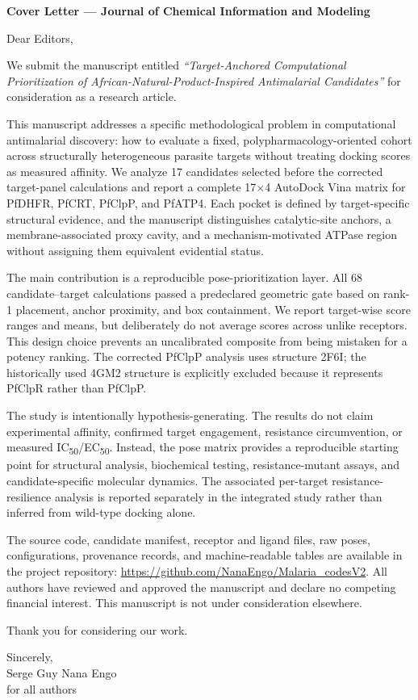 \documentclass[11pt]{article}
\begin{document}
\noindent\textbf{Cover Letter — Journal of Chemical Information and Modeling}

\vspace{1em}
Dear Editors,

We submit the manuscript entitled \textit{“Target-Anchored Computational Prioritization of African-Natural-Product-Inspired Antimalarial Candidates”} for consideration as a research article.

This manuscript addresses a specific methodological problem in computational antimalarial discovery: how to evaluate a fixed, polypharmacology-oriented cohort across structurally heterogeneous parasite targets without treating docking scores as measured affinity. We analyze \num{17} candidates selected before the corrected target-panel calculations and report a complete \num{17}$\times$\num{4} AutoDock Vina matrix for PfDHFR, PfCRT, PfClpP, and PfATP4. Each pocket is defined by target-specific structural evidence, and the manuscript distinguishes catalytic-site anchors, a membrane-associated proxy cavity, and a mechanism-motivated ATPase region without assigning them equivalent evidential status.

The main contribution is a reproducible pose-prioritization layer. All \num{68} candidate--target calculations passed a predeclared geometric gate based on rank-1 placement, anchor proximity, and box containment. We report target-wise score ranges and means, but deliberately do not average scores across unlike receptors. This design choice prevents an uncalibrated composite from being mistaken for a potency ranking. The corrected PfClpP analysis uses structure 2F6I; the historically used 4GM2 structure is explicitly excluded because it represents PfClpR rather than PfClpP.

The study is intentionally hypothesis-generating. The results do not claim experimental affinity, confirmed target engagement, resistance circumvention, or measured IC\textsubscript{50}/EC\textsubscript{50}. Instead, the pose matrix provides a reproducible starting point for structural analysis, biochemical testing, resistance-mutant assays, and candidate-specific molecular dynamics. The associated per-target resistance-resilience analysis is reported separately in the integrated study rather than inferred from wild-type docking alone.

The source code, candidate manifest, receptor and ligand files, raw poses, configurations, provenance records, and machine-readable tables are available in the project repository: \url{https://github.com/NanaEngo/Malaria_codesV2}. All authors have reviewed and approved the manuscript and declare no competing financial interest. This manuscript is not under consideration elsewhere.

Thank you for considering our work.

\vspace{1em}
Sincerely,\\
Serge Guy Nana Engo\\
for all authors
\end{document}
